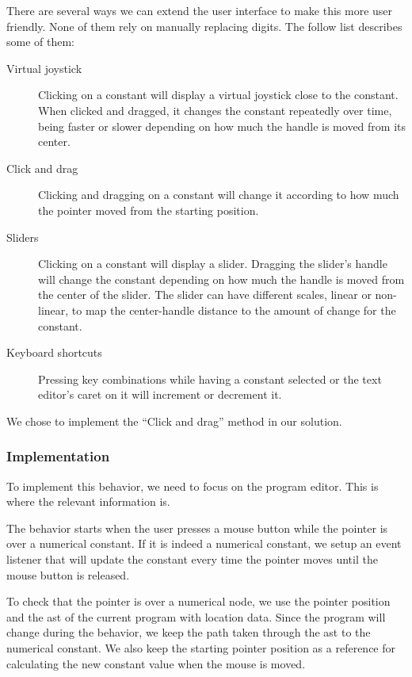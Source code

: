 There are several ways we can extend the user interface to make this more user friendly.
None of them rely on manually replacing digits.
The follow list describes some of them:

\begin{description}
  \item[Virtual joystick] Clicking on a constant will display a virtual joystick close to the constant. When clicked and dragged, it changes the constant repeatedly over time, being faster or slower depending on how much the handle is moved from its center.
  \item[Click and drag] Clicking and dragging on a constant will change it according to how much the pointer moved from the starting position.
  \item[Sliders] Clicking on a constant will display a slider. Dragging the slider's handle will change the constant depending on how much the handle is moved from the center of the slider. The slider can have different scales, linear or non-linear, to map the center-handle distance to the amount of change for the constant.
  \item[Keyboard shortcuts] Pressing key combinations while having a constant selected or the text editor's caret on it will increment or decrement it.
\end{description}

We chose to implement the ``Click and drag'' method in our solution.

\subsubsection{Implementation}
To implement this behavior, we need to focus on the program editor.
This is where the relevant information is.

The behavior starts when the user presses a mouse button while the pointer is over a numerical constant.
If it is indeed a numerical constant, we setup an event listener that will update the constant every time the pointer moves until the mouse button is released.

To check that the pointer is over a numerical node, we use the pointer position and the \gls{ast} of the current program with location data.
Since the program will change during the behavior, we keep the path taken through the \gls{ast} to the numerical constant.
We also keep the starting pointer position as a reference for calculating the new constant value when the mouse is moved.

